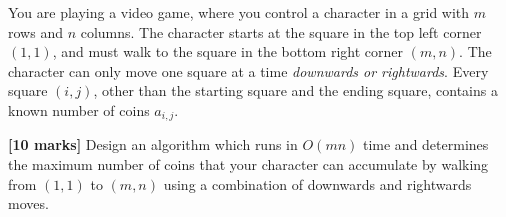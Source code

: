 \documentclass{article}
\begin{document}
\setcounter{question}{0}

\begin{Question}
You are playing a video game, where you control a character in a grid with $m$ rows and $n$ columns. The character starts at the square in the top left corner $(1,1)$, and must walk to the square in the bottom right corner $(m,n)$. The character can only move one square at a time \emph{downwards or rightwards}. Every square $(i,j)$, other than the starting square and the ending square, contains a known number of coins $a_{i,j}$.

\begin{Subquestion}
\textbf{[10 marks]} Design an algorithm which runs in $O(mn)$ time and determines the maximum number of coins that your character can accumulate by walking from $(1,1)$ to $(m,n)$ using a combination of downwards and rightwards moves.\\


\end{Subquestion}
\end{Question}
\end{document}
